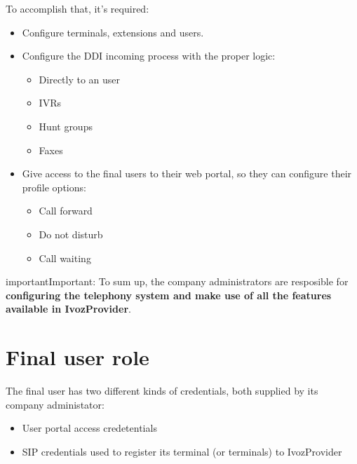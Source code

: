 \documentclass[letterpaper,10pt,english]{sphinxmanual}
\begin{document}
To accomplish that, it's required:
\begin{itemize}
\item {} 
Configure terminals, extensions and users.

\item {} 
Configure the DDI incoming process with the proper logic:
\begin{itemize}
\item {} 
Directly to an user

\item {} 
IVRs

\item {} 
Hunt groups

\item {} 
Faxes

\end{itemize}

\item {} 
Give access to the final users to their web portal, so they can configure
their profile options:
\begin{itemize}
\item {} 
Call forward

\item {} 
Do not disturb

\item {} 
Call waiting

\end{itemize}

\end{itemize}

\begin{notice}{important}{Important:}
To sum up, the company administrators are resposible for
\textbf{configuring the telephony system and make use of all the
features available in IvozProvider}.
\end{notice}


\section{Final user role}
\label{basics/operation_roles/index:final-user-role}
The final user has two different kinds of credentials, both supplied by
its company administator:
\begin{itemize}
\item {} 
User portal access credetentials

\item {} 
SIP credentials used to register its terminal (or terminals) to IvozProvider

\end{itemize}
\end{document}

